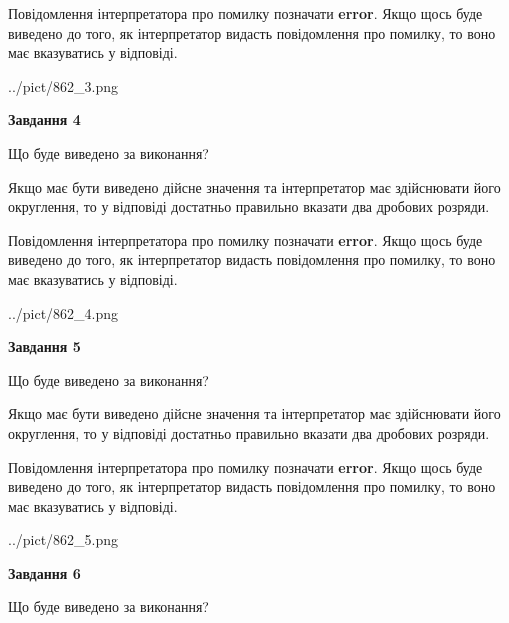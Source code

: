 \documentclass[12pt, ukrainian]{article}
\begin{document}
{\begin {Large}
Повідомлення інтерпретатора про помилку позначати \textbf{error}.
Якщо щось буде виведено до того, як інтерпретатор видасть повідомлення про помилку, 
то воно має вказуватись у відповіді. \par

\begin{center}
	{../pict/862_3.png}
\end{center}
\newpage

{\begin {center}\textbf{Завдання 4}\end {center}}\par
Що буде виведено за виконання? \par

Якщо має бути виведено дійсне значення та інтерпретатор має здійснювати його округлення, 
то у відповіді достатньо правильно вказати два дробових розряди.

Повідомлення інтерпретатора про помилку позначати \textbf{error}.
Якщо щось буде виведено до того, як інтерпретатор видасть повідомлення про помилку, 
то воно має вказуватись у відповіді. \par

\begin{center}
	{../pict/862_4.png}
\end{center}
\newpage

{\begin {center}\textbf{Завдання 5}\end {center}}\par
Що буде виведено за виконання? \par

Якщо має бути виведено дійсне значення та інтерпретатор має здійснювати його округлення, 
то у відповіді достатньо правильно вказати два дробових розряди.

Повідомлення інтерпретатора про помилку позначати \textbf{error}.
Якщо щось буде виведено до того, як інтерпретатор видасть повідомлення про помилку, 
то воно має вказуватись у відповіді. \par

\begin{center}
	{../pict/862_5.png}
\end{center}
\newpage

{\begin {center}\textbf{Завдання 6}\end {center}}\par
Що буде виведено за виконання? \par


\end{Large}}
\end{document}
